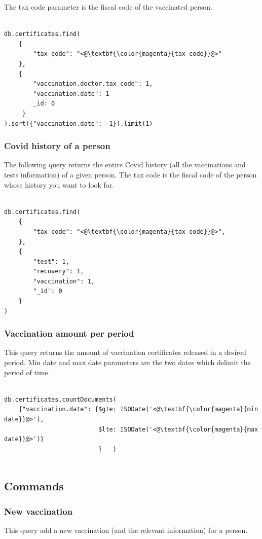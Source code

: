 \documentclass{article}
\begin{document}
The tax code parameter is the fiscal code of the vaccinated person.

\begin{lstlisting}[language=cypher, label=lst:cypher-example]

db.certificates.find(
    {
        "tax_code": "<@\textbf{\color{magenta}{tax code}}@>"
    },
    {
        "vaccination.doctor.tax_code": 1,
        "vaccination.date": 1
        _id: 0
     }
).sort({"vaccination.date": -1}).limit(1)

\end{lstlisting}
\subsubsection{Covid history of a person}
The following query returns the entire Covid history (all the vaccinations and tests information) of a given person.
The tax code is the fiscal code of the person whose history you want to look for.

\begin{lstlisting}[language=cypher, label=lst:cypher-example]

db.certificates.find(
    {
        "tax code": "<@\textbf{\color{magenta}{tax code}}@>",
    },
    {
        "test": 1,
        "recovery": 1,
        "vaccination": 1,
        "_id": 0
    }
)

\end{lstlisting}
\subsubsection{Vaccination amount per period}
This query returns the amount of vaccination certificates released in a desired period. Min date and max date parameters are the two dates which delimit the period of time.

\begin{lstlisting}[language=cypher, label=lst:cypher-example]

db.certificates.countDocuments(
    {"vaccination.date": {$gte: ISODate('<@\textbf{\color{magenta}{min date}}@>'),
                          $lte: ISODate('<@\textbf{\color{magenta}{max date}}@>')}
                          }   )


\end{lstlisting}
\newpage
\subsection{Commands}
\subsubsection{New vaccination}
This query add a new vaccination (and the relevant information) for a person.
\end{document}
